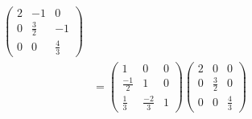 ﻿\documentclass{book} \usepackage{exsheets} \usepackage{xeCJK}
\begin{document}
\begin{solution}
\begin{align*}
\begin{pmatrix}
                                                                                                                                  2&-1&0\\
                                                                                                                                  0&\frac{3}{2}&-1\\
                                                                                                                                  0&0&\frac{4}{3}
                                                                                                                                \end{pmatrix}\\&=
                                                                                                                                                 \begin{pmatrix}
                                                                                                                                                   1&0&0\\
                                                                                                                                                   \frac{-1}{2}&1&0\\
                                                                                                                                                   \frac{1}{3}&\frac{-2}{3}&1
                                                                                                                                                 \end{pmatrix}
                                                                                                                                                                             \begin{pmatrix}
                                                                                                                                                                               2&0&0\\
                                                                                                                                                                               0&\frac{3}{2}&0\\
                                                                                                                                                                               0&0&\frac{4}{3}
                                                                                                                                                                             \end{pmatrix}

\end{align*}
\end{solution}
\end{document}
